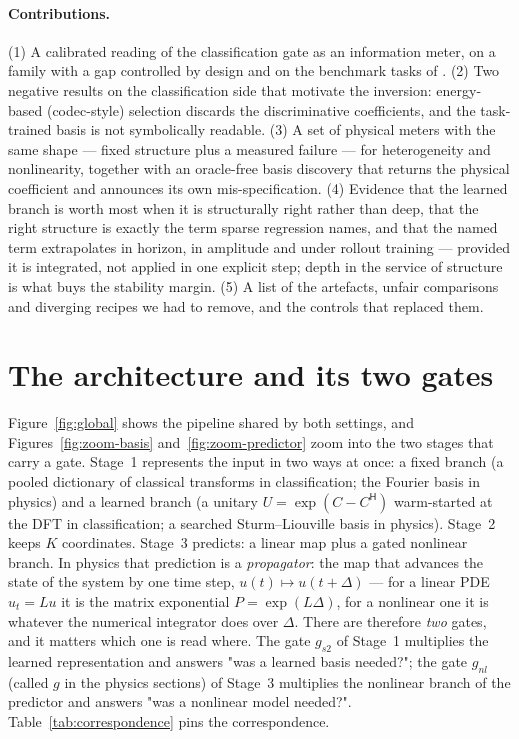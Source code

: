 \documentclass[11pt,a4paper]{article}
\begin{document}
\paragraph{Contributions.} (1) A calibrated reading of the classification gate as an information meter, on a family with a gap controlled by design and on the benchmark tasks of \cite{flob}. (2) Two negative results on the classification side that motivate the inversion: energy-based (codec-style) selection discards the discriminative coefficients, and the task-trained basis is not symbolically readable. (3) A set of physical meters with the same shape — fixed structure plus a measured failure — for heterogeneity and nonlinearity, together with an oracle-free basis discovery that returns the physical coefficient and announces its own mis-specification. (4) Evidence that the learned branch is worth most when it is structurally right rather than deep, that the right structure is exactly the term sparse regression names, and that the named term extrapolates in horizon, in amplitude and under rollout training — provided it is integrated, not applied in one explicit step; depth in the service of structure is what buys the stability margin. (5) A list of the artefacts, unfair comparisons and diverging recipes we had to remove, and the controls that replaced them.

\section{The architecture and its two gates}\label{sec:arch}
Figure~\ref{fig:global} shows the pipeline shared by both settings, and Figures~\ref{fig:zoom-basis} and~\ref{fig:zoom-predictor} zoom into the two stages that carry a gate. Stage~1 represents the input in two ways at once: a fixed branch (a pooled dictionary of classical transforms in classification; the Fourier basis in physics) and a learned branch (a unitary $U = \exp(C - C^{\mathsf H})$ warm-started at the DFT in classification; a searched Sturm–Liouville basis in physics). Stage~2 keeps $K$ coordinates. Stage~3 predicts: a linear map plus a gated nonlinear branch. In physics that prediction is a \emph{propagator}: the map that advances the state of the system by one time step, $u(t)\mapsto u(t+\Delta)$ — for a linear PDE $u_t = Lu$ it is the matrix exponential $P = \exp(L\Delta)$, for a nonlinear one it is whatever the numerical integrator does over $\Delta$. There are therefore \emph{two} gates, and it matters which one is read where. The gate $g_{s2}$ of Stage~1 multiplies the learned representation and answers "was a learned basis needed?"; the gate $g_{nl}$ (called $g$ in the physics sections) of Stage~3 multiplies the nonlinear branch of the predictor and answers "was a nonlinear model needed?". Table~\ref{tab:correspondence} pins the correspondence.
\end{document}
